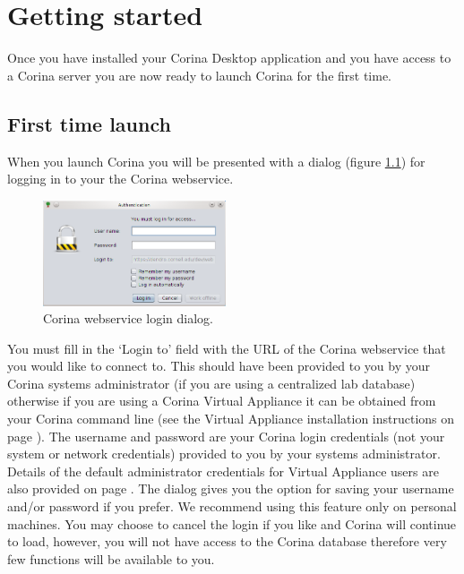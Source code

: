 
\chapter{Getting started}

Once you have installed your Corina Desktop application and you have access to a Corina server you are now ready to launch Corina for the first time.

\section{First time launch}

When you launch Corina you will be presented with a dialog (figure \ref{fig:login}) for logging in to your the Corina webservice.

\begin{figure}
  \begin{center}
    \includegraphics[width=0.48\textwidth]{Images/login.png}
  \end{center}
  \caption{Corina webservice login dialog.}
  \label{fig:login}
\end{figure}

You must fill in the `Login to' field with the URL of the Corina webservice that you would like to connect to.  This should have been provided to you by your Corina systems administrator (if you are using a centralized lab database) otherwise if you are using a Corina Virtual Appliance it can be obtained from your Corina command line (see the Virtual Appliance installation instructions on page \pageref{txt:virtualAppliance}).  The username and password are your Corina login credentials (not your system or network credentials) provided to you by your systems administrator.  Details of the default administrator credentials for Virtual Appliance users are also provided on page \pageref{txt:virtualAppliance}.  The dialog gives you the option for saving your username and/or password if you prefer.  We recommend using this feature only on personal machines.  You may choose to cancel the login if you like and Corina will continue to load, however, you will not have access to the Corina database therefore very few functions will be available to you.

